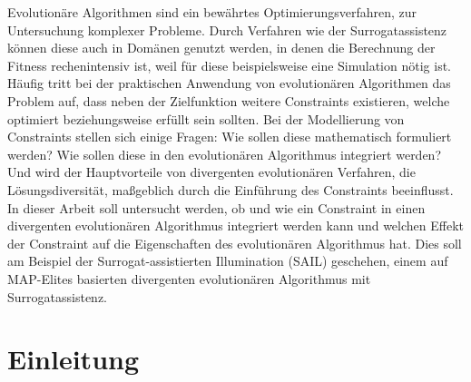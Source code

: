 Evolutionäre Algorithmen sind ein bewährtes Optimierungsverfahren, zur Untersuchung komplexer Probleme.
Durch Verfahren wie der Surrogatassistenz können diese auch in Domänen genutzt werden, in denen die Berechnung der Fitness rechenintensiv ist, weil für diese beispielsweise eine Simulation nötig ist.
Häufig tritt bei der praktischen Anwendung von evolutionären Algorithmen das Problem auf, dass neben der Zielfunktion weitere Constraints existieren, welche optimiert beziehungsweise erfüllt sein sollten.
Bei der Modellierung von Constraints stellen sich einige Fragen:
Wie sollen diese mathematisch formuliert werden? 
Wie sollen diese in den evolutionären Algorithmus integriert werden?
Und wird der Hauptvorteile von divergenten evolutionären Verfahren, die Lösungsdiversität, maßgeblich durch die Einführung des Constraints beeinflusst.
In dieser Arbeit soll untersucht werden, ob und wie ein Constraint in einen divergenten evolutionären Algorithmus integriert werden kann und welchen Effekt der Constraint auf die Eigenschaften des evolutionären Algorithmus hat.
Dies soll am Beispiel der Surrogat-assistierten Illumination (SAIL) geschehen, einem auf MAP-Elites basierten divergenten evolutionären Algorithmus mit Surrogatassistenz.

\section{Einleitung}

